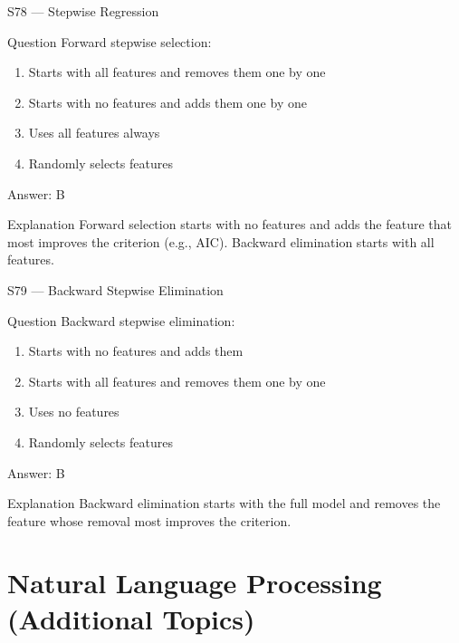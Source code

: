 \documentclass[aspectratio=169,8pt]{beamer}
\begin{document}
	\begin{frame}{S78 --- Stepwise Regression}
		\begin{block}{Question}
			Forward stepwise selection:
			\begin{enumerate}
				\item Starts with all features and removes them one by one
				\item Starts with no features and adds them one by one
				\item Uses all features always
				\item Randomly selects features
			\end{enumerate}
		\end{block}
		\begin{exampleblock}{Answer: B}\end{exampleblock}
		\begin{block}{Explanation}
			Forward selection starts with no features and adds the feature that most improves the criterion (e.g., AIC). Backward elimination starts with all features.
		\end{block}
	\end{frame}
	
	\begin{frame}{S79 --- Backward Stepwise Elimination}
		\begin{block}{Question}
			Backward stepwise elimination:
			\begin{enumerate}
				\item Starts with no features and adds them
				\item Starts with all features and removes them one by one
				\item Uses no features
				\item Randomly selects features
			\end{enumerate}
		\end{block}
		\begin{exampleblock}{Answer: B}\end{exampleblock}
		\begin{block}{Explanation}
			Backward elimination starts with the full model and removes the feature whose removal most improves the criterion.
		\end{block}
	\end{frame}
	
	\section{Natural Language Processing (Additional Topics)}
	
\end{document}

